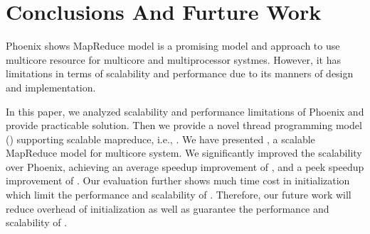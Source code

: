 \section{Conclusions And Furture Work}
\label{sec:concl}
Phoenix shows MapReduce model is a promising model and approach to use multicore resource for multicore and multiprocessor systmes.
However, it has limitations in terms of scalability and performance due to its manners of design and implementation.

In this paper, we analyzed scalability and performance limitations of Phoenix and provide practicable solution.
Then we provide a novel thread programming model (\myth) supporting scalable mapreduce, i.e., \myds. 
We have presented \myds, a scalable MapReduce model for multicore system.
We significantly improved the scalability over Phoenix, achieving an average speedup improvement of , and a peek speedup improvement of .
Our evaluation further shows much time cost in initialization which limit the performance and scalability of \myds.
Therefore, our future work will reduce overhead of initialization as well as guarantee the performance and scalability of \myds.
